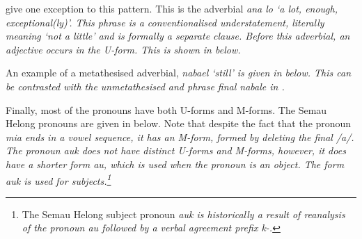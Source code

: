 \cite{baca12} give one exception to this pattern.
This is the adverbial \it{ana lo} `a lot, enough, exceptional(ly)'.
This phrase is a conventionalised understatement, literally meaning `not a little'
and is formally a separate clause.
Before this adverbial, an adjective occurs in the U-form.
This is shown in  below.

\begin{exe}\let\eachwordone=\it
	\label{ex:HelAdj5}
\end{exe}

An example of a metathesised adverbial, \it{nabael} `still'
is given in  below.
This can be contrasted with the unmetathesised
and phrase final \it{nabale} in .

\begin{exe}\let\eachwordone=\it
	\label{ex:HelAdv1}
	\label{ex:HelAdv2} %
\end{exe}

Finally, most of the pronouns have both U-forms and M-forms.
The Semau Helong pronouns are given in  below.
Note that despite the fact that the  pronoun \it{mia} ends in a vowel sequence,
it has an M-form, formed by deleting the final /a/.
The  pronoun \it{auk} does not have distinct U-forms and M-forms,
however, it does have a shorter form \it{au},
which is used when the pronoun is an object.
The form \it{auk} is used for  subjects.\footnote{
		The Semau Helong  subject pronoun \it{auk}
		is historically a result of reanalysis of the pronoun \it{au} followed
		by a  verbal agreement prefix \it{k-}.}


